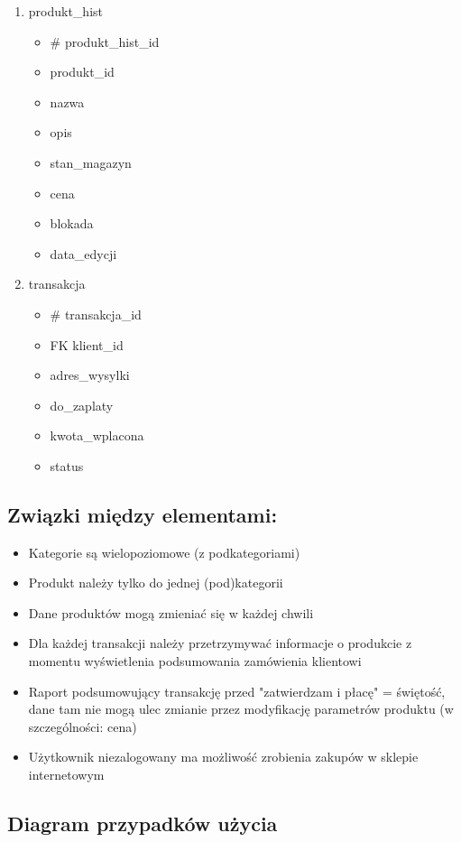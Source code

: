 \begin{enumerate}
\item produkt\_hist
\begin{itemize}
	\item \# produkt\_hist\_id
	\item produkt\_id
	\item nazwa
	\item opis
	\item stan\_magazyn
	\item cena
	\item blokada
	\item data\_edycji
\end{itemize}
\item transakcja
\begin{itemize}
	\item \# transakcja\_id
	\item FK klient\_id
	\item adres\_wysylki
	\item do\_zaplaty
	\item kwota\_wplacona
	\item status
\end{itemize}

\end{enumerate}


\subsection{Związki między elementami:}
\begin{itemize}
\item Kategorie są wielopoziomowe (z podkategoriami)
\item Produkt należy tylko do jednej (pod)kategorii
\item Dane produktów mogą zmieniać się w każdej chwili
\item Dla każdej transakcji należy przetrzymywać informacje o produkcie z momentu wyświetlenia podsumowania zamówienia klientowi
\item Raport podsumowujący transakcję przed "zatwierdzam i płacę" = świętość, dane tam nie mogą ulec zmianie przez modyfikację parametrów produktu (w szczególności: cena)
\item Użytkownik niezalogowany ma możliwość zrobienia zakupów w sklepie internetowym
\end{itemize}

\subsection{Diagram przypadków użycia}

